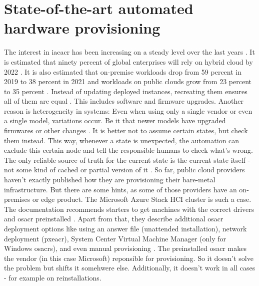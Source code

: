 \section{State-of-the-art automated hardware provisioning} %
The interest in \gls{iacacr} has been increasing on a steady level over the last years \cite{googletrends_iac}.
\newline
It is estimated that ninety percent of global enterprises will rely on hybrid cloud by 2022 \cite{idc_covid_multicloud}.
It is also estimated that on-premise workloads drop from 59 percent in 2019 to 38 percent in 2021 and workloads on public clouds grow from 23 percent to 35 percent \cite{thestreet_public_cloud_spending_covid}.
\newline
Instead of updating deployed instances, recreating them ensures all of them are equal \cite{iac_bare_metal}. This includes software and firmware upgrades.
\newline
Another reason is heterogeneity in systems: Even when using only a single vendor or even a single model, variations occur. Be it that newer models have upgraded firmwares or other  changes \cite{iac_bare_metal}.
\newline
It is better not to assume certain states, but check them instead. This way, whenever a state is unexpected, the automation can exclude this certain node and tell the responsible humans to check what's wrong. The only reliable source of truth for the current state is the current state itself - not some kind of cached or partial version of it \cite{iac_bare_metal}.
\newline
So far, public cloud providers haven't exactly published how they are provisioning their bare-metal infrastructure.
\newline
But there are some hints, as some of those providers have an on-premises or edge product. The Microsoft Azure Stack HCI cluster is such a case. The documentation recommends starters to get machines with the correct drivers and \gls{osacr} preinstalled \cite{microsoft_azure_stack_deployment}. Apart from that, they describe additional \gls{osacr} deployment options like using an answer file (unattended installation), network deployment (\gls{pxeacr}), System Center Virtual Machine Manager (only for Windows \gls{osacr}s), and even manual provisioning \cite{microsoft_azure_stack_deployment}. The preinstalled \gls{osacr} makes the vendor (in this case Microsoft) reponsible for provisioning. So it doesn't solve the problem but shifts it somehwere else. Additionally, it doesn't work in all cases - for example on reinstallations.
